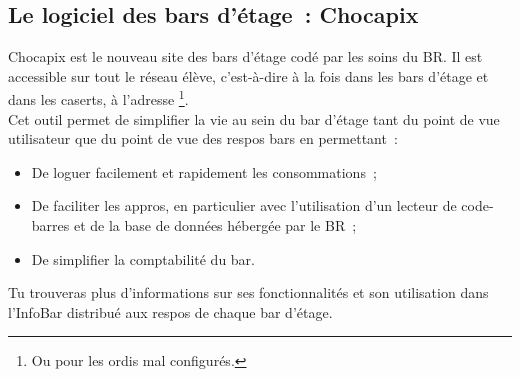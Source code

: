 \subsection{Le logiciel des bars d'étage~: Chocapix}
\label{chocapix}


Chocapix est le nouveau site des bars d'étage codé par les soins du BR. Il est accessible sur tout le réseau élève, c'est-à-dire à la fois dans les bars d'étage et dans les caserts, à l'adresse \footnote{Ou  pour les ordis mal configurés.}.\\
Cet outil permet de simplifier la vie au sein du bar d'étage tant du point de vue utilisateur que du point de vue des respos bars en permettant~:
\begin{itemize}
\item De loguer facilement et rapidement les consommations~;
\item De faciliter les appros, en particulier avec l'utilisation d'un lecteur de code-barres et de la base de données hébergée par le BR~;
\item De simplifier la comptabilité du bar.\\
\end{itemize}
Tu trouveras plus d'informations sur ses fonctionnalités et son utilisation dans l'InfoBar distribué aux respos de chaque bar d'étage.
